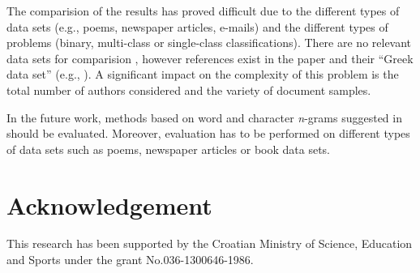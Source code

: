 \documentclass{llncs}
\begin{document}
The comparision of the results has proved difficult due to the different types of data sets (e.g., poems,
newspaper articles, e-mails) and the different types of problems (binary, multi-class or
single-class classifications). There are no relevant data sets for comparision
\cite{zhao2005effective}, however references exist in the paper
\cite{stamatatos2001computer} and their ``Greek data set'' (e.g.,
\cite{keselj2003n}). A significant impact on the complexity of this problem 
is the total number of authors considered and the variety of document samples.

In the future work, methods based on word and character \emph{n}-grams suggested
in \cite{keselj2003n,peng2003language,coyotl2006authorship} should be
evaluated. Moreover, evaluation has to be performed on different types of data sets
such as poems, newspaper articles or book data sets.

\section*{Acknowledgement}
This research has been supported by the Croatian Ministry of Science, Education and Sports under the grant No.036-1300646-1986.



\end{document}
